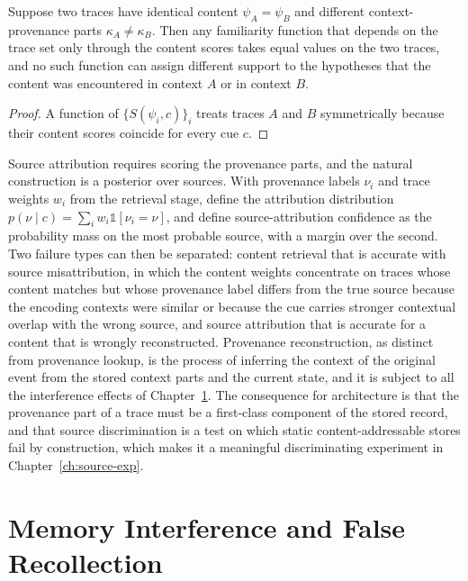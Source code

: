 \begin{proposition}\label{prop:source}
Suppose two traces have identical content $\psi_A=\psi_B$ and different context-provenance parts $\kappa_A\ne\kappa_B$. Then any familiarity function that depends on the trace set only through the content scores takes equal values on the two traces, and no such function can assign different support to the hypotheses that the content was encountered in context $A$ or in context $B$.
\end{proposition}

\begin{proof}
A function of $\{S(\psi_i,c)\}_i$ treats traces $A$ and $B$ symmetrically because their content scores coincide for every cue $c$.
\end{proof}

Source attribution requires scoring the provenance parts, and the natural construction is a posterior over sources. With provenance labels $\nu_i$ and trace weights $w_i$ from the retrieval stage, define the attribution distribution $p(\nu\mid c)=\sum_i w_i\mathbb 1[\nu_i=\nu]$, and define source-attribution confidence as the probability mass on the most probable source, with a margin over the second. Two failure types can then be separated: content retrieval that is accurate with source misattribution, in which the content weights concentrate on traces whose content matches but whose provenance label differs from the true source because the encoding contexts were similar or because the cue carries stronger contextual overlap with the wrong source, and source attribution that is accurate for a content that is wrongly reconstructed. Provenance reconstruction, as distinct from provenance lookup, is the process of inferring the context of the original event from the stored context parts and the current state, and it is subject to all the interference effects of Chapter~\ref{ch:interference}. The consequence for architecture is that the provenance part of a trace must be a first-class component of the stored record, and that source discrimination is a test on which static content-addressable stores fail by construction, which makes it a meaningful discriminating experiment in Chapter~\ref{ch:source-exp}.

\chapter{Memory Interference and False Recollection}\label{ch:interference}

